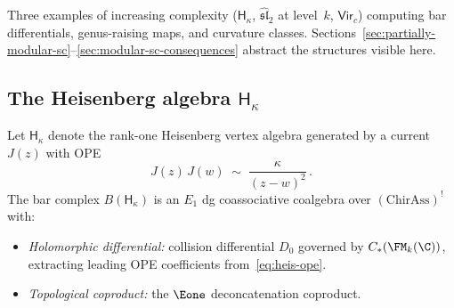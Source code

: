 \providecommand{\Heis}{\mathsf{H}}
\providecommand{\slhat}{\widehat{\mathfrak{sl}}}
\providecommand{\Vir}{\mathsf{Vir}}
\providecommand{\hvee}{h^{\!\vee}}

Three examples of increasing complexity ($\Heis_\kappa$, $\slhat_2$ at level~$k$, $\Vir_c$) computing bar differentials, genus-raising maps, and curvature classes. Sections~\ref{sec:partially-modular-sc}--\ref{sec:modular-sc-consequences} abstract the structures visible here.

\subsection{The Heisenberg algebra $\Heis_\kappa$}
\label{subsec:example-heisenberg}

Let $\Heis_\kappa$ denote the rank-one Heisenberg vertex algebra
generated by a current $J(z)$ with OPE
\begin{equation}\label{eq:heis-ope}
 J(z)\, J(w) \;\sim\; \frac{\kappa}{(z - w)^2}\,.
\end{equation}
The bar complex $B(\Heis_\kappa)$ is an $E_1$ dg coassociative coalgebra over $(\mathrm{ChirAss})^!$ with:
\begin{itemize}
\item \emph{Holomorphic differential:}
 collision differential $D_0$ governed by
 $C_\ast(\FM_k(\C))$, extracting leading OPE coefficients
 from~\eqref{eq:heis-ope}.
\item \emph{Topological coproduct:}
 the $\Eone$ deconcatenation coproduct.
\end{itemize}

